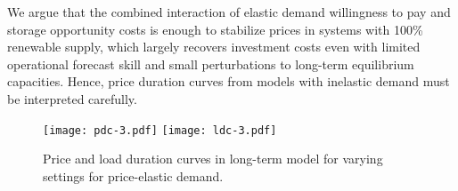 \documentclass[final,3p]{elsarticle}
\begin{document}
We argue that the combined interaction of elastic demand willingness to pay and
storage opportunity costs is enough to stabilize prices in systems with 100\%
renewable supply, which largely recovers investment costs even with limited
operational forecast skill and small perturbations to long-term equilibrium
capacities. Hence, price duration curves from models with inelastic demand must
be interpreted carefully.

\vspace{1cm}

\begin{figure}[!ht]
	\centering
	\footnotesize\sffamily
	\texttt{[image: pdc-3.pdf]}
	\texttt{[image: ldc-3.pdf]}
	\caption{Price and load duration curves in long-term model for varying settings for price-elastic demand.}
	\label{fig:price-duration}
\end{figure}

\newpage
{\normalsize

}
\end{document}
